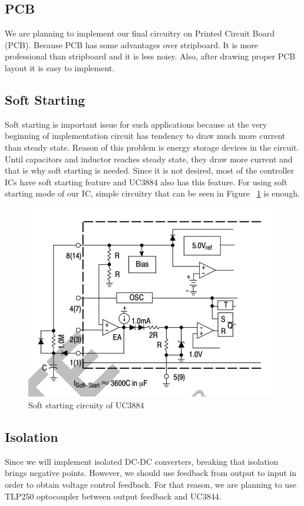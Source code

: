 \documentclass{article}
\begin{document}
\subsection{PCB}
We are planning to implement our final circuitry on Printed Circuit Board (PCB). Because PCB has some advantages over stripboard. It is more professional than stripboard and it is less noisy. Also, after drawing proper PCB layout it is easy to implement.
\subsection{Soft Starting}
Soft starting is important issue for such applications because at the very beginning of implementation circuit has tendency to draw much more current than steady state. Reason of this problem is energy storage devices in the circuit. Until capacitors and inductor reaches steady state, they draw more current and that is why soft starting is needed. Since it is not desired, most of the controller ICs have soft starting feature and UC3884 also has this feature. For using soft starting mode of our IC, simple circuitry that can be seen in Figure ~\ref{fig:soft} is enough.
\begin{figure}[H]
    \centering
    \includegraphics[width=0.5\linewidth]{ic.jpeg}
    \caption {Soft starting circuity of UC3884}
    \label{fig:soft}
\end{figure}
\subsection{Isolation}
Since we will implement isolated DC-DC converters, breaking that isolation brings negative points. However, we should use feedback from output to input in order to obtain voltage control feedback. For that reason, we are planning to use TLP250 optocoupler between output feedback and UC3844.
\end{document}
